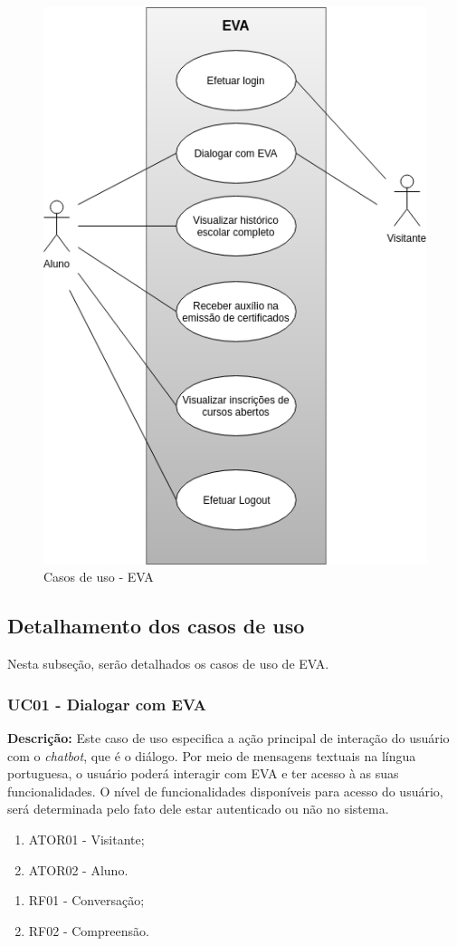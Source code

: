 \begin{figure}[htb!]
  \caption{
    \label{cap:03:fig:diagrama}
    Casos de uso - EVA
  }
  \includegraphics[width=0.3\linewidth]{imagens/CasoDeUsoEva.png}
  \mfonte
\end{figure}


\subsection{Detalhamento dos casos de uso}\label{cap3-detalhamento-casos-de-uso}

Nesta subseção, serão detalhados os casos de uso de EVA.

\subsubsection{UC01 - Dialogar com EVA}

\textbf{Descrição:} Este caso de uso especifica a ação principal de interação do usuário com o \textit{chatbot}, que é o diálogo. Por meio de mensagens textuais na língua portuguesa, o usuário poderá interagir com EVA e ter acesso à as suas funcionalidades. O nível de funcionalidades disponíveis para acesso do usuário, será determinada pelo fato dele estar autenticado ou não no sistema.

\begin{enumerate}[label=\alph*)]
    \tightlist
    \item ATOR01 - Visitante;
    \item ATOR02 - Aluno.
\end{enumerate}
        
\begin{enumerate}[label=\alph*)]
    \tightlist
        \item RF01 - Conversação;
        \item RF02 - Compreensão.
\end{enumerate}
        
